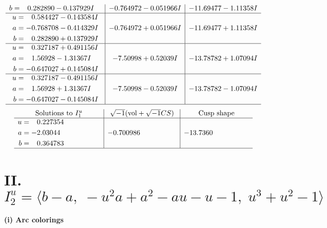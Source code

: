 \documentclass[1p]{elsarticle_modified}
\theoremstyle{definition}
\newcommand{\I}{\sqrt{-1}}
\begin{document}
$$\begin{array}{c|c|c}
\begin{aligned}
b &= \phantom{-}0.282890 - 0.137929 I\end{aligned}
 & -0.764972 - 0.051966 I & -11.69477 - 1.11358 I \\ \hline\begin{aligned}
u &= \phantom{-}0.584427 - 0.143584 I \\
a &= -0.768708 - 0.414329 I \\
b &= \phantom{-}0.282890 + 0.137929 I\end{aligned}
 & -0.764972 + 0.051966 I & -11.69477 + 1.11358 I \\ \hline\begin{aligned}
u &= \phantom{-}0.327187 + 0.491156 I \\
a &= \phantom{-}1.56928 - 1.31367 I \\
b &= -0.647027 + 0.145084 I\end{aligned}
 & -7.50998 + 0.52039 I & -13.78782 + 1.07094 I \\ \hline\begin{aligned}
u &= \phantom{-}0.327187 - 0.491156 I \\
a &= \phantom{-}1.56928 + 1.31367 I \\
b &= -0.647027 - 0.145084 I\end{aligned}
 & -7.50998 - 0.52039 I & -13.78782 - 1.07094 I\\
 \hline 
 \end{array}$$\newpage$$\begin{array}{c|c|c}  
\text{Solutions to }I^u_{1}& \I (\text{vol} + \sqrt{-1}CS) & \text{Cusp shape}\\
 \hline 
\begin{aligned}
u &= \phantom{-}0.227354\phantom{ +0.000000I} \\
a &= -2.03044\phantom{ +0.000000I} \\
b &= \phantom{-}0.364783\phantom{ +0.000000I}\end{aligned}
 & -0.700986\phantom{ +0.000000I} & -13.7360\phantom{ +0.000000I}\\
 \hline 
 \end{array}$$\newpage\newpage\renewcommand{\arraystretch}{1}
\centering \section*{II. $I^u_{2}= \langle b- a,\;- u^2 a+a^2- a u- u-1,\;u^3+u^2-1 \rangle$}
\flushleft \textbf{(i) Arc colorings}\\
\end{document}
